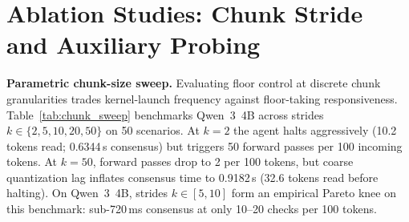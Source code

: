 \documentclass{article}
\begin{document}
\begin{table}[h]
\centering
\caption{\textbf{Token accounting breakdown per scenario (\textsc{Handraiser}, 200 scenarios).}}
\label{tab:token_accounting}
\renewcommand{\arraystretch}{0.88}
\vspace{0.05cm}
\end{table}

\section{Ablation Studies: Chunk Stride and Auxiliary Probing}
\label{app:probes}

\textbf{Parametric chunk-size sweep.} Evaluating floor control at discrete chunk granularities trades kernel-launch frequency against floor-taking responsiveness. Table~\ref{tab:chunk_sweep} benchmarks Qwen~3~4B across strides $k \in \{2, 5, 10, 20, 50\}$ on 50 scenarios. At $k=2$ the agent halts aggressively (10.2 tokens read; 0.6344\,s consensus) but triggers 50 forward passes per 100 incoming tokens. At $k=50$, forward passes drop to 2 per 100 tokens, but coarse quantization lag inflates consensus time to 0.9182\,s (32.6 tokens read before halting). On Qwen~3~4B, strides $k \in [5, 10]$ form an empirical Pareto knee on this benchmark: sub-720\,ms consensus at only 10--20 checks per 100 tokens.
\end{document}
